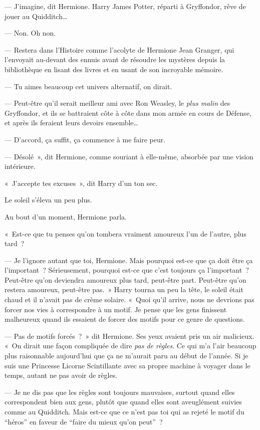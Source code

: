 --- J'imagine, dit Hermione.
Harry James Potter, réparti à Gryffondor, rêve de jouer au Quidditch…

--- Non.
Oh non.

--- Restera dans l'Histoire comme l'acolyte de Hermione Jean Granger, qui l'envoyait au-devant des ennuis avant de résoudre les mystères depuis la bibliothèque en lisant des livres et en usant de son incroyable mémoire.

--- Tu aimes beaucoup cet univers alternatif, on dirait.

--- Peut-être qu'il serait meilleur ami avec Ron Weasley, le \emph{plus malin} des Gryffondor, et ils se battraient côte à côte dans mon armée en cours de Défense, et après ils feraient leurs devoirs ensemble…

--- D'accord, ça suffit, ça commence à me faire peur.

--- Désolé~», dit Hermione, comme souriant à elle-même, absorbée par une vision intérieure.

«~J'accepte tes excuses~», dit Harry d'un ton sec.

Le soleil s'éleva un peu plus.

Au bout d'un moment, Hermione parla.

«~Est-ce que tu penses qu'on tombera vraiment amoureux l'un de l'autre, plus tard~?

--- Je l'ignore autant que toi, Hermione.
Mais pourquoi est-ce que ça doit être ça l'important~?
Sérieusement, pourquoi est-ce que c'est toujours ça l'important~?
Peut-être qu'on deviendra amoureux plus tard, peut-être part.
Peut-être qu'on restera amoureux, peut-être pas.~»
Harry tourna un peu la tête, le soleil était chaud et il n'avait pas de crème solaire.
«~Quoi qu'il arrive, nous ne devrions pas forcer nos vies à correspondre à un motif.
Je pense que les gens finissent malheureux quand ils essaient de forcer des motifs pour ce genre de questions.

--- Pas de motifs forcés~?~»
dit Hermione.
Ses yeux avaient pris un air malicieux.
«~On dirait une façon compliquée de dire \emph{pas de règles}.
Ce qui m'a l'air beaucoup plus raisonnable aujourd'hui que ça ne m'aurait paru au début de l'année.
Si je suis une Princesse Licorne Scintillante avec sa propre machine à voyager dans le temps, autant ne pas avoir de règles.

--- Je ne dis pas que les règles sont toujours mauvaises, surtout quand elles correspondent bien aux gens, plutôt que quand elles sont aveuglément suivies comme au Quidditch.
Mais est-ce que ce n'est pas toi qui as rejeté le motif du “héros” en faveur de “faire du mieux qu'on peut”~?

